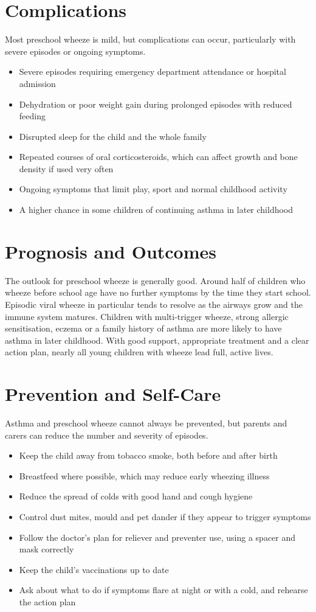 \section*{Complications}
Most preschool wheeze is mild, but complications can occur, particularly with severe episodes or ongoing symptoms.

\begin{itemize}
    \item Severe episodes requiring emergency department attendance or hospital admission
    \item Dehydration or poor weight gain during prolonged episodes with reduced feeding
    \item Disrupted sleep for the child and the whole family
    \item Repeated courses of oral corticosteroids, which can affect growth and bone density if used very often
    \item Ongoing symptoms that limit play, sport and normal childhood activity
    \item A higher chance in some children of continuing asthma in later childhood
\end{itemize}

\section*{Prognosis and Outcomes}
The outlook for preschool wheeze is generally good. Around half of children who wheeze before school age have no further symptoms by the time they start school. Episodic viral wheeze in particular tends to resolve as the airways grow and the immune system matures. Children with multi-trigger wheeze, strong allergic sensitisation, eczema or a family history of asthma are more likely to have asthma in later childhood. With good support, appropriate treatment and a clear action plan, nearly all young children with wheeze lead full, active lives.

\section*{Prevention and Self-Care}
Asthma and preschool wheeze cannot always be prevented, but parents and carers can reduce the number and severity of episodes.

\begin{itemize}
    \item Keep the child away from tobacco smoke, both before and after birth
    \item Breastfeed where possible, which may reduce early wheezing illness
    \item Reduce the spread of colds with good hand and cough hygiene
    \item Control dust mites, mould and pet dander if they appear to trigger symptoms
    \item Follow the doctor's plan for reliever and preventer use, using a spacer and mask correctly
    \item Keep the child's vaccinations up to date
    \item Ask about what to do if symptoms flare at night or with a cold, and rehearse the action plan
\end{itemize}


